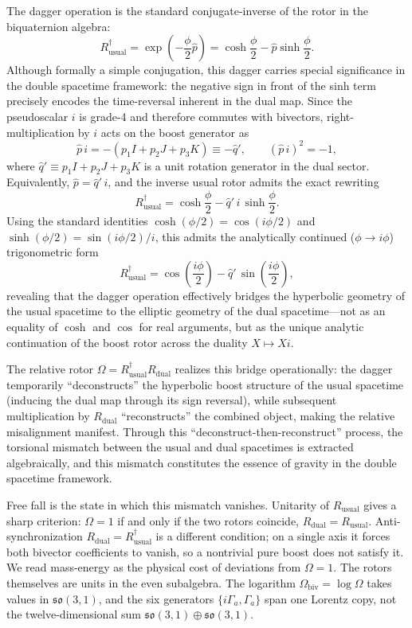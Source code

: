 \documentclass[a4paper]{article}
\begin{document}
The dagger operation is the standard conjugate-inverse of the rotor in the biquaternion algebra:
\[
R_\text{usual}^\dagger = \exp\!\left( -\frac{\phi}{2} \hat{p} \right)
= \cosh\frac{\phi}{2} - \hat{p} \sinh\frac{\phi}{2}.
\]
Although formally a simple conjugation, this dagger carries special significance in the double spacetime framework: the negative sign in front of the sinh term precisely encodes the time-reversal inherent in the dual map. Since the pseudoscalar $i$ is grade-4 and therefore commutes with bivectors, right-multiplication by $i$ acts on the boost generator as
\[
\hat{p}\, i = - (p_1 I + p_2 J + p_3 K) \equiv -\hat{q}',
\qquad (\hat{p}\, i)^2 = -1,
\]
where $\hat{q}' \equiv p_1 I + p_2 J + p_3 K$ is a unit rotation generator in the dual sector. Equivalently, $\hat{p} = \hat{q}'\, i$, and the inverse usual rotor admits the exact rewriting
\[
R_\text{usual}^\dagger = \cosh\frac{\phi}{2} - \hat{q}'\, i\, \sinh\frac{\phi}{2}.
\]
Using the standard identities $\cosh(\phi/2) = \cos(i\phi/2)$ and $\sinh(\phi/2) = \sin(i\phi/2)/i$, this admits the analytically continued ($\phi \to i\phi$) trigonometric form
\[
R_\text{usual}^\dagger = \cos\!\left(\frac{i\phi}{2}\right) - \hat{q}'\, \sin\!\left(\frac{i\phi}{2}\right),
\]
revealing that the dagger operation effectively bridges the hyperbolic geometry of the usual spacetime to the elliptic geometry of the dual spacetime---not as an equality of $\cosh$ and $\cos$ for real arguments, but as the unique analytic continuation of the boost rotor across the duality $X \mapsto X i$.

The relative rotor $\Omega = R_\text{usual}^\dagger R_\text{dual}$ realizes this bridge operationally: the dagger temporarily ``deconstructs'' the hyperbolic boost structure of the usual spacetime (inducing the dual map through its sign reversal), while subsequent multiplication by $R_\text{dual}$ ``reconstructs'' the combined object, making the relative misalignment manifest. Through this ``deconstruct-then-reconstruct'' process, the torsional mismatch between the usual and dual spacetimes is extracted algebraically, and this mismatch constitutes the essence of gravity in the double spacetime framework.

Free fall is the state in which this mismatch vanishes. Unitarity of $R_{\mathrm{usual}}$ gives a sharp criterion: $\Omega=1$ if and only if the two rotors coincide, $R_{\mathrm{dual}}=R_{\mathrm{usual}}$. Anti-synchronization $R_{\mathrm{dual}}=R_{\mathrm{usual}}^\dagger$ is a different condition; on a single axis it forces both bivector coefficients to vanish, so a nontrivial pure boost does not satisfy it. We read mass-energy as the physical cost of deviations from $\Omega=1$. The rotors themselves are units in the even subalgebra. The logarithm $\Omega_{\mathrm{biv}}=\log\Omega$ takes values in $\mathfrak{so}(3,1)$, and the six generators $\{i\Gamma_a,\Gamma_a\}$ span one Lorentz copy, not the twelve-dimensional sum $\mathfrak{so}(3,1)\oplus\mathfrak{so}(3,1)$.
\end{document}

